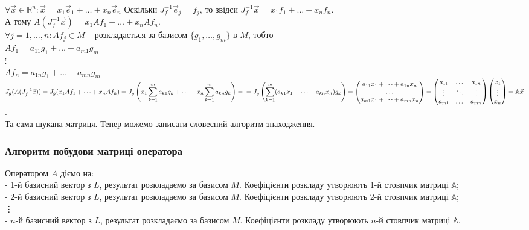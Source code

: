 \documentclass[a4paper, 10pt]{article}
\theoremstyle{theoremdd}
\begin{document}
	$\forall \vec{x} \in \mathbb{R}^n: \vec{x} = x_1 \vec{e}_1+ \dots + x_n \vec{e}_n$
	Оскільки $J_f^{-1} \vec{e}_j = f_j$, то звідси $J_f^{-1} \vec{x} = x_1f_1+\dots+x_nf_n$. \\ А тому $A(J_f^{-1}\vec{x}) = x_1Af_1 + \dots + x_nAf_n$.\\
	$\forall j = 1,\dots,n: Af_j \in M$ -- розкладається за базисом $\{g_1,\dots,g_m\}$ в $M$, тобто\\
	$Af_1 = a_{11}g_1 + \dots + a_{m1}g_m$\\
	$\vdots$\\
	$Af_n = a_{1n}g_1 + \dots + a_{mn}g_m$\\
	$J_g(A(J_f^{-1}\vec{x})) = J_g(x_1Af_1 + \dots + x_nAf_n) = \displaystyle J_g\left(x_1 \sum_{k=1}^m a_{k1}g_k + \dots + x_n \sum_{k=1}^m a_{kn}g_k\right) = \\ = J_g\left(\sum_{k=1}^m (a_{k1}x_1 + \dots + a_{kn}x_n)g_k \right) = \begin{pmatrix}
	a_{11}x_1 + \dots + a_{1n}x_n \\
	\dots \\
	a_{m1}x_1 + \dots + a_{mn}x_n \\
	\end{pmatrix} = \begin{pmatrix}
	a_{11} & \dots & a_{1n} \\
	\vdots & \ddots & \vdots \\
	a_{m1} & \dots & a_{mn}
	\end{pmatrix} \begin{pmatrix}
	x_1 \\ \vdots \\ x_n
	\end{pmatrix} = \mathbb{A}\vec{x}$.\\
	Та сама шукана матриця. Тепер можемо записати словесний алгоритм знаходження.
	
	\subsubsection*{Алгоритм побудови матриці оператора}
	Оператором $A$ діємо на:\\
	- 1-й базисний вектор з $L$, результат розкладаємо за базисом $M$. Коефіцієнти розкладу утворюють 1-й стовпчик матриці $\mathbb{A}$;\\
	- 2-й базисний вектор з $L$, результат розкладаємо за базисом $M$. Коефіцієнти розкладу утворюють 2-й стовпчик матриці $\mathbb{A}$;\\
	\vdots \\
	- $n$-й базисний вектор з $L$, результат розкладаємо за базисом $M$. Коефіцієнти розкладу утворюють $n$-й стовпчик матриці $\mathbb{A}$.
	
\end{document}
